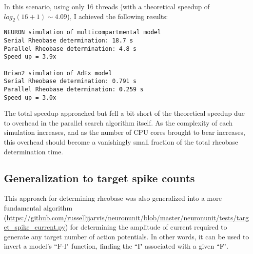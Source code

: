 In this scenario, using only 16 threads (with a theoretical speedup of $log_2(16+1) \sim 4.09$), I achieved the following results:
\begin{verbatim}
NEURON simulation of multicompartmental model
Serial Rheobase determination: 18.7 s
Parallel Rheobase determination: 4.8 s
Speed up = 3.9x

Brian2 simulation of AdEx model
Serial Rheobase determination: 0.791 s
Parallel Rheobase determination: 0.259 s
Speed up = 3.0x
\end{verbatim}

The total speedup approached but fell a bit short of the theoretical speedup due to overhead in the parallel search algorithm itself.
As the complexity of each simulation increases, and as the number of CPU cores brought to bear increases, this overhead should become a vanishingly small fraction of the total rheobase determination time.

\subsection{Generalization to target spike counts}
This approach for determining rheobase was also generalized into a more fundamental algorithm (\url{https://github.com/russelljjarvis/neuronunit/blob/master/neuronunit/tests/target_spike_current.py}) for determining the amplitude of current required to generate any target number of action potentials.
In other words, it can be used to invert a model's ``F-I" function, finding the ``I" associated with a given ``F".

